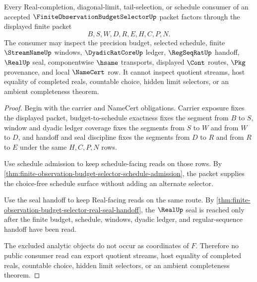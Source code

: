 \begin{theorem}
\label{thm:finite-observation-budget-selector-nonescape}
Every Real-completion, diagonal-limit, tail-selection, or schedule consumer of an accepted $\FiniteObservationBudgetSelectorUp$ packet factors through the displayed finite packet
$$
B,S,W,D,R,E,H,C,P,N.
$$
The consumer may inspect the precision budget, selected schedule, finite $\StreamNameUp$ windows, $\DyadicRatCoreUp$ ledger, $\RegSeqRatUp$ handoff, $\RealUp$ seal, componentwise $\hsame$ transports, displayed $\Cont$ routes, $\Pkg$ provenance, and local $\NameCert$ row. It cannot inspect quotient streams, host equality of completed reals, countable choice, hidden limit selectors, or an ambient completeness theorem.
\end{theorem}
\begin{proof}
Begin with the carrier and NameCert obligations. Carrier exposure fixes the displayed packet, budget-to-schedule exactness fixes the segment from $B$ to $S$, window and dyadic ledger coverage fixes the segments from $S$ to $W$ and from $W$ to $D$, and handoff and seal discipline fixes the segments from $D$ to $R$ and from $R$ to $E$ under the same $H,C,P,N$ rows.

Use schedule admission to keep schedule-facing reads on those rows. By \autoref{thm:finite-observation-budget-selector-schedule-admission}, the packet supplies the choice-free schedule surface without adding an alternate selector.

Use the seal handoff to keep Real-facing reads on the same route. By \autoref{thm:finite-observation-budget-selector-real-seal-handoff}, the $\RealUp$ seal is reached only after the finite budget, schedule, windows, dyadic ledger, and regular-sequence handoff have been read.

The excluded analytic objects do not occur as coordinates of $F$. Therefore no public consumer read can export quotient streams, host equality of completed reals, countable choice, hidden limit selectors, or an ambient completeness theorem.
\end{proof}

